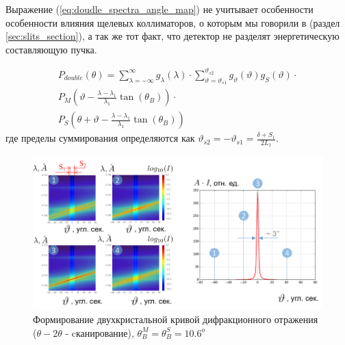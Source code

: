 Выражение (\ref{eq:doudle_spectra_angle_map}) не учитывает особенности особенности влияния щелевых коллиматоров, о которым мы говорили в
(раздел \ref{sec:slits_section}), а так же тот факт, что детектор не разделят энергетическую составляющую пучка.


\begin{eqnarray} \label{eq:doudle_spectra_angle_map_on_detector}
  P_{double}(\theta) = \sum_{\lambda = -\infty}^{\infty}g_{\lambda}(\lambda)\cdot
  \sum_{\vartheta = \vartheta_{s1}}^{\vartheta_{s2}} g_{\vartheta}(\vartheta) g_{S}(\vartheta) \cdot \nonumber \\
   P_M \left(\vartheta - \frac{\lambda - \lambda_1}{\lambda_1}\tan(\theta_B) \right) \cdot \nonumber \\
   P_S \left(\theta + \vartheta - \frac{\lambda - \lambda_1}{\lambda_1}\tan(\theta_B)\right)
 \end{eqnarray}
 где пределы суммирования определяются как $\vartheta_{s2} = - \vartheta_{s1} = \frac{\delta+S_1}{2L_1}$.

 \begin{figure}[H]
   \centering
   \includegraphics[width=1\textwidth]{images/double_crystal_form_kdo.png}
   \caption{Формирование двухкристальной кривой дифракционного отражения ($\theta - 2\theta$ - cканирование),
   $\theta_B^M = \theta_B^S = 10.6^o$  }
   \label{ris:double_crystal_form_kdo}
 \end{figure}

